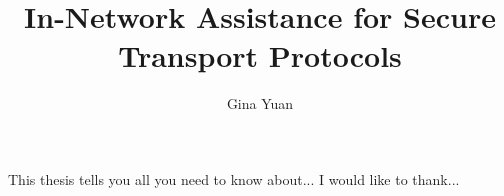 \documentclass{report}
\begin{document}
\title{In-Network Assistance for Secure Transport Protocols}
\author{Gina Yuan}
 
\beforepreface
{}
This thesis tells you all you need to know about...
I would like to thank...
\afterpreface








\appendix



\end{document}
